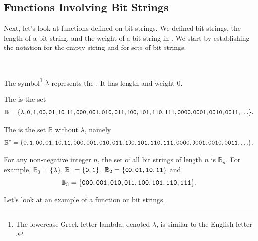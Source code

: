 \newcommand{\subbitstringfunctions}{Functions Involving Bit Strings}
\subsection{\subbitstringfunctions}
\label{sub_bit_string_functions}

Next, let's look at functions defined on bit strings. We defined bit strings, the length of a bit string, and the weight of a bit string in .  We start by establishing the notation for the empty string and for sets of bit strings.

\begin{defn}
\label{defn_sets_bit_strings}
~
    \begin{apart}
        \item The symbol\footnote{The lowercase Greek letter lambda, denoted $\lambda$, is similar to the English letter .} $\lambda$ represents the .  It has length and weight 0. 
        
        \item The  is the set $$\mathbb{B} = \{ \lambda, \texttt{0}, \texttt{1}, \texttt{00}, \texttt{01}, \texttt{10}, \texttt{11}, \texttt{000}, \texttt{001}, \texttt{010}, \texttt{011}, \texttt{100}, \texttt{101}, \texttt{110}, \texttt{111}, \texttt{0000}, \texttt{0001}, \texttt{0010}, \texttt{0011}, \ldots \}.$$

        \item The  is the set $\mathbb{B}$ without $\lambda$, namely
        $$\mathbb{B}^* = \{\texttt{0}, \texttt{1}, \texttt{00}, \texttt{01}, \texttt{10}, \texttt{11}, \texttt{000}, \texttt{001}, \texttt{010}, \texttt{011}, \texttt{100}, \texttt{101}, \texttt{110}, \texttt{111}, \texttt{0000}, \texttt{0001}, \texttt{0010}, \texttt{0011}, \ldots \}.$$

        \item For any non-negative integer $n$, the set of all bit strings of length $n$ is $\mathbb{B}_n.$
        For example, $\mathbb{B}_0 = \{\lambda\}$, $\mathbb{B}_1 = \{\texttt{0}, \texttt{1}\}$, $\mathbb{B}_2 = \{\texttt{00}, \texttt{01}, \texttt{10}, \texttt{11}\}$ and 
        $$\mathbb{B}_3 = \{\texttt{000}, \texttt{001}, \texttt{010}, \texttt{011},\texttt{100}, \texttt{101}, \texttt{110}, \texttt{111}\}.$$
    \end{apart}
\end{defn}

Let's look at an example of a function on bit strings.

